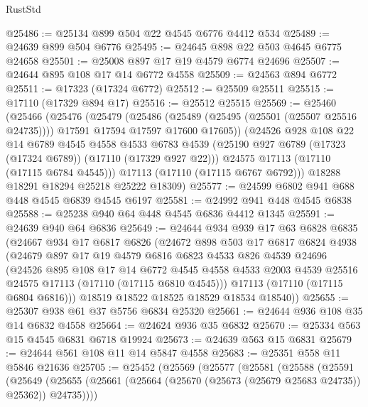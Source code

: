 \begin{lexlean}{RustStd}
\begin{coremodule}
@25486 := @25134 @899 @504 @22 @4545 @6776 @4412 @534
@25489 := @24639 @899 @504 @6776
@25495 := @24645 @898 @22 @503 @4645 @6775 @24658
@25501 := @25008 @897 @17 @19 @4579 @6774 @24696
@25507 := @24644 @895 @108 @17 @14 @6772 @4558
@25509 := @24563 @894 @6772
@25511 := @17323 (@17324 @6772)
@25512 := @25509 @25511
@25515 := @17110 (@17329 @894 @17)
@25516 := @25512 @25515
@25569 := @25460
    (@25466
      (@25476
        (@25479
          (@25486
            (@25489 (@25495 (@25501 (@25507 @25516 @24735))))
            @17591
            @17594
            @17597
            @17600
            @17605))
        (@24526
          @928
          @108
          @22
          @14
          @6789
          @4545
          @4558
          @4533
          @6783
          @4539
          (@25190 @927 @6789 (@17323 (@17324 @6789)) (@17110 (@17329 @927 @22)))
          @24575
          @17113
          (@17110 (@17115 @6784 @4545)))
        @17113
        (@17110 (@17115 @6767 @6792)))
      @18288
      @18291
      @18294
      @25218
      @25222
      @18309)
@25577 := @24599 @6802 @941 @688 @448 @4545 @6839 @4545 @6197
@25581 := @24992 @941 @448 @4545 @6838
@25588 := @25238 @940 @64 @448 @4545 @6836 @4412 @1345
@25591 := @24639 @940 @64 @6836
@25649 := @24644
    @934
    @939
    @17
    @63
    @6828
    @6835
    (@24667
      @934
      @17
      @6817
      @6826
      (@24672
        @898
        @503
        @17
        @6817
        @6824
        @4938
        (@24679
          @897
          @17
          @19
          @4579
          @6816
          @6823
          @4533
          @826
          @4539
          @24696
          (@24526
            @895
            @108
            @17
            @14
            @6772
            @4545
            @4558
            @4533
            @2003
            @4539
            @25516
            @24575
            @17113
            (@17110 (@17115 @6810 @4545)))
          @17113
          (@17110 (@17115 @6804 @6816)))
        @18519
        @18522
        @18525
        @18529
        @18534
        @18540))
@25655 := @25307 @938 @61 @37 @5756 @6834 @25320
@25661 := @24644 @936 @108 @35 @14 @6832 @4558
@25664 := @24624 @936 @35 @6832
@25670 := @25334 @563 @15 @4545 @6831 @6718 @19924
@25673 := @24639 @563 @15 @6831
@25679 := @24644 @561 @108 @11 @14 @5847 @4558
@25683 := @25351 @558 @11 @5846 @21636
@25705 := @25452
    (@25569
      (@25577
        (@25581
          (@25588
            (@25591
              (@25649
                (@25655 (@25661 (@25664 (@25670 (@25673 (@25679 @25683 @24735)) @25362)) @24735))))

\end{coremodule}
\end{lexlean}
